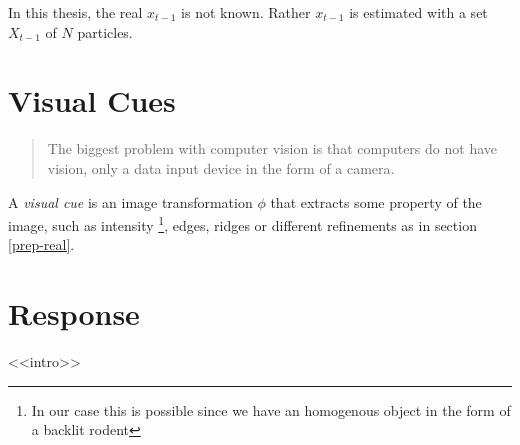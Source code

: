 In this thesis, the real $x_{t-1}$ is not known. Rather $x_{t-1}$ is
estimated with a set $X_{t-1}$ of $N$ particles.

\section{Visual Cues}
\begin{quote}
    The biggest problem with computer vision is that computers do not have
    vision, only a data input device in the form of a camera.
\end{quote}
A \emph{visual cue} is an image transformation $\phi$ that extracts
some property of the image, such as intensity
\footnote{In our case this is possible since we have an homogenous object
in the form of a backlit rodent}, edges, ridges\cite{Hedvig} or different 
refinements as in section \ref{prep-real}.

\section{Response}

<<intro>>


